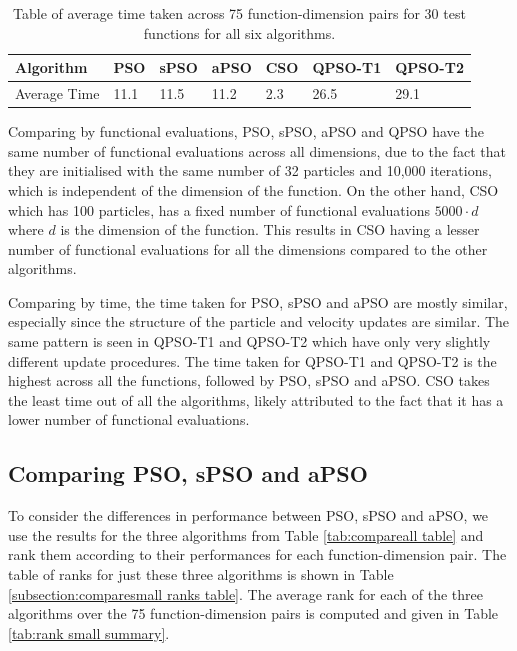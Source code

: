 \documentclass[12pt]{article}
\theoremstyle{definition}
\begin{document}
\begin{table}[H]
    \centering
    \begin{tabular}{|l|l|l|l|l|l|l|}
    \toprule
    Algorithm & PSO & sPSO & aPSO & CSO & QPSO-T1 & QPSO-T2 \\ \midrule
    Average Time & 11.1 & 11.5 & 11.2 & 2.3 & 26.5 & 29.1 \\
    \bottomrule
    \end{tabular}
    \caption{Table of average time taken across 75 function-dimension pairs for 30 test functions for all six algorithms.}
    \label{tab:time summary}
\end{table}

Comparing by functional evaluations, PSO, sPSO, aPSO and QPSO have the same number of functional evaluations across all dimensions, due to the fact that they are initialised with the same number of 32 particles and 10,000 iterations, which is independent of the dimension of the function. On the other hand, CSO which has 100 particles, has a fixed number of functional evaluations $5000 \cdot d$ where $d$ is the dimension of the function. This results in CSO having a lesser number of functional evaluations for all the dimensions compared to the other algorithms. \newline

Comparing by time, the time taken for PSO, sPSO and aPSO are mostly similar, especially since the structure of the particle and velocity updates are similar. The same pattern is seen in QPSO-T1 and QPSO-T2 which have only very slightly different update procedures. The time taken for QPSO-T1 and QPSO-T2 is the highest across all the functions, followed by PSO, sPSO and aPSO. CSO takes the least time out of all the algorithms, likely attributed to the fact that it has a lower number of functional evaluations.

\subsection{Comparing PSO, sPSO and aPSO}
To consider the differences in performance between PSO, sPSO and aPSO, we use the results for the three algorithms from Table \ref{tab:compareall table} and rank them according to their performances for each function-dimension pair. The table of ranks for just these three algorithms is shown in Table \ref{subsection:comparesmall ranks table}. The average rank for each of the three algorithms over the 75 function-dimension pairs is computed and given in Table \ref{tab:rank small summary}.
\end{document}
